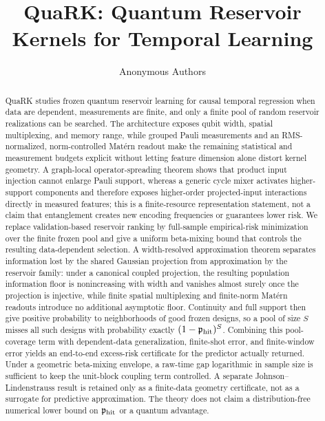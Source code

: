 \documentclass[10pt]{article}
\title{QuaRK: Quantum Reservoir Kernels for Temporal Learning}
\author{\name Anonymous Authors}
\begin{document}
\maketitle

\begin{abstract}
QuaRK studies frozen quantum reservoir learning for causal temporal regression
when data are dependent, measurements are finite, and only a finite pool of
random reservoir realizations can be searched.  The architecture exposes qubit
width, spatial multiplexing, and memory range, while grouped Pauli measurements
and an RMS-normalized, norm-controlled Mat\'ern readout make the remaining
statistical and measurement budgets explicit without letting feature dimension
alone distort kernel geometry.  A graph-local operator-spreading theorem
shows that product input injection cannot enlarge Pauli support, whereas a
generic cycle mixer activates higher-support components and therefore exposes
higher-order projected-input interactions directly in measured features; this
is a finite-resource representation statement, not a claim that entanglement
creates new encoding frequencies or guarantees lower risk.  We replace
validation-based reservoir ranking by full-sample empirical-risk minimization
over the finite frozen pool and give
a uniform beta-mixing bound that controls the resulting data-dependent
selection.  A width-resolved approximation theorem separates information lost
by the shared Gaussian projection from approximation by the reservoir family:
under a canonical coupled projection, the resulting population information
floor is nonincreasing with width and vanishes almost surely once the projection
is injective, while finite spatial multiplexing and finite-norm Mat\'ern
readouts introduce no additional asymptotic floor.  Continuity and full support
then give positive probability to neighborhoods of good frozen designs, so a
pool of size $S$ misses all such designs with probability exactly
$(1-\mathfrak p_{\mathrm{hit}})^S$.  Combining this pool-coverage term with dependent-data
generalization, finite-shot error, and finite-window error yields an end-to-end
excess-risk certificate for the predictor actually returned.  Under a
geometric beta-mixing envelope, a raw-time gap logarithmic in sample size is
sufficient to keep the unit-block coupling term controlled.  A separate
Johnson--Lindenstrauss result is retained only as a finite-data geometry
certificate, not as a surrogate for predictive approximation.  The theory does
not claim a distribution-free numerical lower bound on $\mathfrak p_{\mathrm{hit}}$ or a
quantum advantage.
\end{abstract}














\appendix



\end{document}
